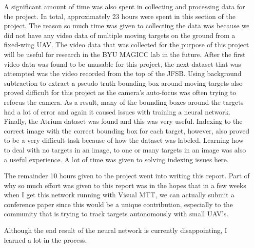 \documentclass[letterpaper, 10 pt, conference]{ieeeconf}  %
\begin{document}
A significant amount of time was also spent in collecting and processing data for the project. In total, approximately 23 hours were spent in this section of the project. The reason so much time was given to collecting the data was because we did not have any video data of multiple moving targets on the ground from a fixed-wing UAV. The video data that was collected for the purpose of this project will be useful for research in the BYU MAGICC lab in the future. After the first video data was found to be unusable for this project, the next dataset that was attempted was the video recorded from the top of the JFSB. Using background subtraction to extract a pseudo truth bounding box around moving targets also proved difficult for this project as the camera's auto-focus was often trying to refocus the camera. As a result, many of the bounding boxes around the targets had a lot of error and again it caused issues with training a neural network. Finally, the Atrium dataset was found and this was very useful. Indexing to the correct image with the correct bounding box for each target, however, also proved to be a very difficult task because of how the dataset was labeled. Learning how to deal with no targets in an image, to one or many targets in an image was also a useful experience. A lot of time was given to solving indexing issues here.

The remainder 10 hours given to the project went into writing this report. Part of why so much effort was given to this report was in the hopes that in a few weeks when I get this network running with Visual MTT, we can actually submit a conference paper since this would be a unique contribution, especially to the community that is trying to track targets autonomously with small UAV's. 

Although the end result of the neural network is currently disappointing, I learned a lot in the process. 









\end{document}
